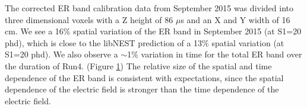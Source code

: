 The corrected ER band calibration data from September 2015 was divided into three dimensional voxels with a Z height of 86 $\mu$s and an X and Y width of 16 cm.  We see a 16\% spatial variation of the ER band in September 2015 (at S1=20 phd), which is close to the libNEST prediction of a 13\% spatial variation (at S1=20 phd).  We also observe a $\sim$1\% variation in time for the total ER band over the duration of Run4. (Figure \ref{ERBandVariation}) The relative size of the spatial and time dependence of the ER band is consistent with expectations, since the spatial dependence of the electric field is stronger than the time dependence of the electric field. 


\begin{figure}[!h]
\centering
{}
\qquad
{}
\label{ERBandVariation}
\end{figure}

